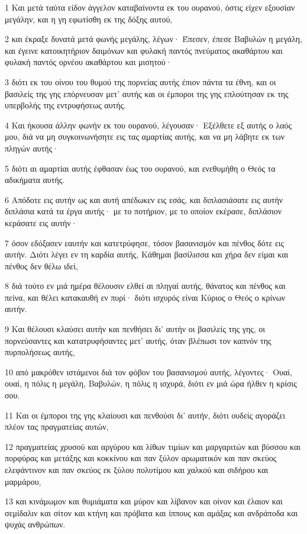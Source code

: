 \par 1 Και μετά ταύτα είδον άγγελον καταβαίνοντα εκ του ουρανού, όστις είχεν εξουσίαν μεγάλην, και η γη εφωτίσθη εκ της δόξης αυτού,
\par 2 και έκραξε δυνατά μετά φωνής μεγάλης, λέγων· Έπεσεν, έπεσε Βαβυλών η μεγάλη, και έγεινε κατοικητήριον δαιμόνων και φυλακή παντός πνεύματος ακαθάρτου και φυλακή παντός ορνέου ακαθάρτου και μισητού·
\par 3 διότι εκ του οίνου του θυμού της πορνείας αυτής έπιον πάντα τα έθνη, και οι βασιλείς της γης επόρνευσαν μετ' αυτής και οι έμποροι της γης επλούτησαν εκ της υπερβολής της εντρυφήσεως αυτής.
\par 4 Και ήκουσα άλλην φωνήν εκ του ουρανού, λέγουσαν· Εξέλθετε εξ αυτής ο λαός μου, διά να μη συγκοινωνήσητε εις τας αμαρτίας αυτής, και να μη λάβητε εκ των πληγών αυτής·
\par 5 διότι αι αμαρτίαι αυτής έφθασαν έως του ουρανού, και ενεθυμήθη ο Θεός τα αδικήματα αυτής.
\par 6 Απόδοτε εις αυτήν ως και αυτή απέδωκεν εις εσάς, και διπλασιάσατε εις αυτήν διπλάσια κατά τα έργα αυτής· με το ποτήριον, με το οποίον εκέρασε, διπλάσιον κεράσατε εις αυτήν·
\par 7 όσον εδόξασεν εαυτήν και κατετρύφησε, τόσον βασανισμόν και πένθος δότε εις αυτήν. Διότι λέγει εν τη καρδία αυτής, Κάθημαι βασίλισσα και χήρα δεν είμαι και πένθος δεν θέλω ιδεί,
\par 8 διά τούτο εν μιά ημέρα θέλουσιν ελθεί αι πληγαί αυτής, θάνατος και πένθος και πείνα, και θέλει κατακαυθή εν πυρί· διότι ισχυρός είναι Κύριος ο Θεός ο κρίνων αυτήν.
\par 9 Και θέλουσι κλαύσει αυτήν και πενθήσει δι' αυτήν οι βασιλείς της γης, οι πορνεύσαντες και κατατρυφήσαντες μετ' αυτής, όταν βλέπωσι τον καπνόν της πυρπολήσεως αυτής,
\par 10 από μακρόθεν ιστάμενοι διά τον φόβον του βασανισμού αυτής, λέγοντες· Ουαί, ουαί, η πόλις η μεγάλη, Βαβυλών, η πόλις η ισχυρά, διότι εν μιά ώρα ήλθεν η κρίσις σου.
\par 11 Και οι έμποροι της γης κλαίουσι και πενθούσι δι' αυτήν, διότι ουδείς αγοράζει πλέον τας πραγματείας αυτών,
\par 12 πραγματείας χρυσού και αργύρου και λίθων τιμίων και μαργαριτών και βύσσου και πορφύρας και μετάξης και κοκκίνου και παν ξύλον αρωματικόν και παν σκεύος ελεφάντινον και παν σκεύος εκ ξύλου πολυτίμου και χαλκού και σιδήρου και μαρμάρου,
\par 13 και κινάμωμον και θυμιάματα και μύρον και λίβανον και οίνον και έλαιον και σεμίδαλιν και σίτον και κτήνη και πρόβατα και ίππους και αμάξας και ανδράποδα και ψυχάς ανθρώπων.
